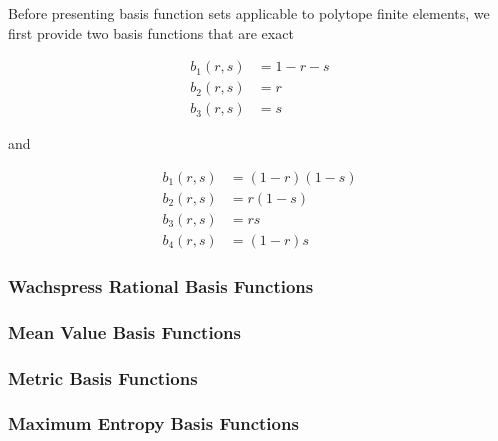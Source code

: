 Before presenting basis function sets applicable to polytope finite elements, we first provide two basis functions that are exact 

\begin{equation}
\label{eq::2D_lin_basis_functions}
\begin{aligned}
	b_1(r,s) & = 1-r-s \\
	b_2(r,s) & = r \\
	b_3(r,s) & = s 
\end{aligned}
\end{equation}

\noindent 

and

\begin{equation}
\label{eq::BiL_basis_functions}
\begin{aligned}
	b_1(r,s) & = (1-r)(1-s) \\
	b_2(r,s) & = r(1-s) \\
	b_3(r,s) & = rs \\
	b_4(r,s) & = (1-r)s
\end{aligned}
\end{equation}


\subsubsection{Wachspress Rational Basis Functions}
\label{sec::BF_2D_Linear_Wachspress}

\subsubsection{Mean Value Basis Functions}
\label{sec::BF_2D_Linear_MV}

\subsubsection{Metric Basis Functions}
\label{sec::BF_2D_Linear_Metric}

\subsubsection{Maximum Entropy Basis Functions}
\label{sec::BF_2D_Linear_ME}

